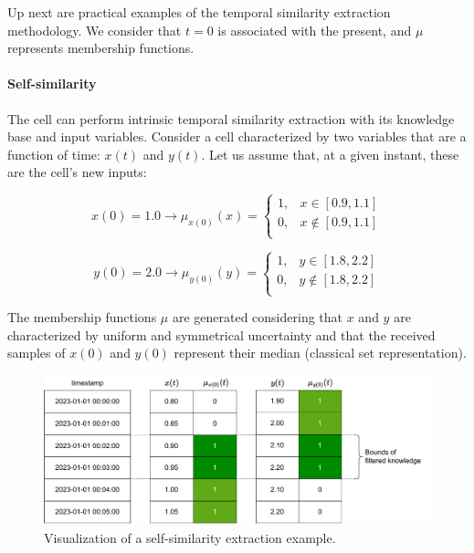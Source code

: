 Up next are practical examples of the temporal similarity extraction methodology. We consider that $t=0$ is associated with the present, and $\mu$ represents membership functions.

\paragraph{Self-similarity}

The cell can perform intrinsic temporal similarity extraction with its knowledge base and input variables. Consider a cell characterized by two variables that are a function of time: $x(t)$ and $y(t)$.
Let us assume that, at a given instant, these are the cell's new inputs:

\begin{equation}
    x(0) = 1.0 \rightarrow \mu_{x(0)}(x) =
    \begin{cases}
        1, & x \in [0.9, 1.1]    \\
        0, & x \notin [0.9, 1.1] \\
    \end{cases}
\end{equation}

\begin{equation}
    y(0) = 2.0 \rightarrow \mu_{y(0)}(y) =
    \begin{cases}
        1, & y \in [1.8, 2.2]    \\
        0, & y \notin [1.8, 2.2] \\
    \end{cases}
\end{equation}

The membership functions $\mu$ are generated considering that $x$ and $y$ are characterized by uniform and symmetrical uncertainty and that the received samples of $x(0)$ and $y(0)$ represent their median (classical set representation).

\begin{figure}[h!]
    \centering
    \includegraphics[width=\linewidth]{figures/chapter4/cell/solo_state_estimation.pdf}
    \caption{Visualization of a self-similarity extraction example.}
    \label{fig:solo_state_estimation}
\end{figure}



